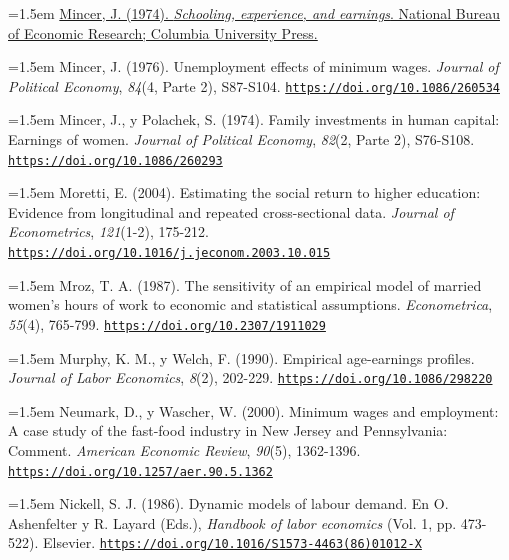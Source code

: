 \documentclass[10pt,a4paper]{article}
\begin{document}
\noindent\hangindent=1.5em \href{https://www.nber.org/books-and-chapters/schooling-experience-and-earnings}{Mincer, J. (1974). \textit{Schooling, experience, and earnings}. National Bureau of Economic Research; Columbia University Press.}

\noindent\hangindent=1.5em Mincer, J. (1976). Unemployment effects of minimum wages. \textit{Journal of Political Economy}, \textit{84}(4, Parte 2), S87-S104. \href{https://doi.org/10.1086/260534}{\nolinkurl{https://doi.org/10.1086/260534}}

\noindent\hangindent=1.5em Mincer, J., y Polachek, S. (1974). Family investments in human capital: Earnings of women. \textit{Journal of Political Economy}, \textit{82}(2, Parte 2), S76-S108. \href{https://doi.org/10.1086/260293}{\nolinkurl{https://doi.org/10.1086/260293}}

\noindent\hangindent=1.5em Moretti, E. (2004). Estimating the social return to higher education: Evidence from longitudinal and repeated cross-sectional data. \textit{Journal of Econometrics}, \textit{121}(1-2), 175-212. \href{https://doi.org/10.1016/j.jeconom.2003.10.015}{\nolinkurl{https://doi.org/10.1016/j.jeconom.2003.10.015}}

\noindent\hangindent=1.5em Mroz, T. A. (1987). The sensitivity of an empirical model of married women's hours of work to economic and statistical assumptions. \textit{Econometrica}, \textit{55}(4), 765-799. \href{https://doi.org/10.2307/1911029}{\nolinkurl{https://doi.org/10.2307/1911029}}

\noindent\hangindent=1.5em Murphy, K. M., y Welch, F. (1990). Empirical age-earnings profiles. \textit{Journal of Labor Economics}, \textit{8}(2), 202-229. \href{https://doi.org/10.1086/298220}{\nolinkurl{https://doi.org/10.1086/298220}}

\noindent\hangindent=1.5em Neumark, D., y Wascher, W. (2000). Minimum wages and employment: A case study of the fast-food industry in New Jersey and Pennsylvania: Comment. \textit{American Economic Review}, \textit{90}(5), 1362-1396. \href{https://doi.org/10.1257/aer.90.5.1362}{\nolinkurl{https://doi.org/10.1257/aer.90.5.1362}}

\noindent\hangindent=1.5em Nickell, S. J. (1986). Dynamic models of labour demand. En O. Ashenfelter y R. Layard (Eds.), \textit{Handbook of labor economics} (Vol. 1, pp. 473-522). Elsevier. \href{https://doi.org/10.1016/S1573-4463(86)01012-X}{\nolinkurl{https://doi.org/10.1016/S1573-4463(86)01012-X}}
\end{document}
